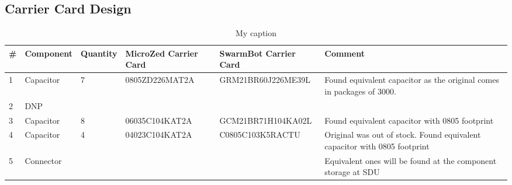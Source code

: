 \subsection{Carrier Card Design}
\label{sub:carrier_design}

\begin{sidewaystable}

\centering
\caption{My caption}
\label{my-label}
\begin{tabular}{|p{0.5cm}|p{2cm}|p{1.5cm}|l|l|p{5cm}|}
\hline
\#      & Component              & Quantity & MicroZed Carrier Card & SwarmBot Carrier Card & Comment                                                                                                                                                                                                      \\ \hline
1       & Capacitor              & 7        & 0805ZD226MAT2A        & GRM21BR60J226ME39L    & Found equivalent capacitor as the original comes in packages of 3000.                                                                                                                                        \\ \hline
2       & DNP                    &          &                       &                       &                                                                                                                                                                                                              \\ \hline
3       & Capacitor              & 8        & 06035C104KAT2A        & GCM21BR71H104KA02L    & Found equivalent capacitor with 0805 footprint                                                                                                                                                               \\ \hline
4       & Capacitor              & 4        & 04023C104KAT2A        & C0805C103K5RACTU      & Original was out of stock. Found equivalent capacitor with 0805 footprint                                                                                                                                    \\ \hline
5       & Connector              &          &                       &                       & Equivalent ones will be found at the component storage at SDU                                                                                                                                                \\ \hline

\end{tabular}
\end{sidewaystable}

